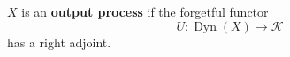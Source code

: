$X$ is an \textbf{output process} if the forgetful functor
$$U: \operatorname{Dyn}(X) \longrightarrow \mathcal{K}$$
has a right adjoint.
